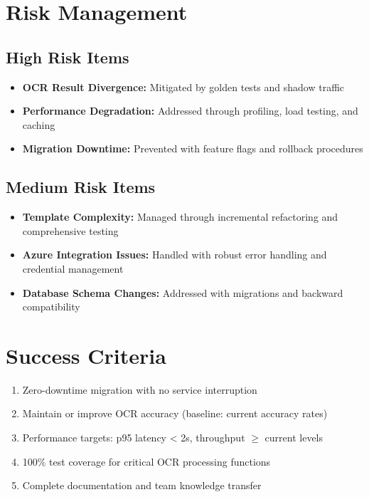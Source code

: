 \documentclass[11pt,a4paper]{article}
\begin{document}
\section{Risk Management}

\subsection{High Risk Items}
\begin{itemize}
    \item \textbf{OCR Result Divergence:} Mitigated by golden tests and shadow traffic
    \item \textbf{Performance Degradation:} Addressed through profiling, load testing, and caching
    \item \textbf{Migration Downtime:} Prevented with feature flags and rollback procedures
\end{itemize}

\subsection{Medium Risk Items}
\begin{itemize}
    \item \textbf{Template Complexity:} Managed through incremental refactoring and comprehensive testing
    \item \textbf{Azure Integration Issues:} Handled with robust error handling and credential management
    \item \textbf{Database Schema Changes:} Addressed with migrations and backward compatibility
\end{itemize}

\section{Success Criteria}

\begin{enumerate}
    \item Zero-downtime migration with no service interruption
    \item Maintain or improve OCR accuracy (baseline: current accuracy rates)
    \item Performance targets: p95 latency < 2s, throughput $\geq$ current levels
    \item 100\% test coverage for critical OCR processing functions
    \item Complete documentation and team knowledge transfer
\end{enumerate}
\end{document}
